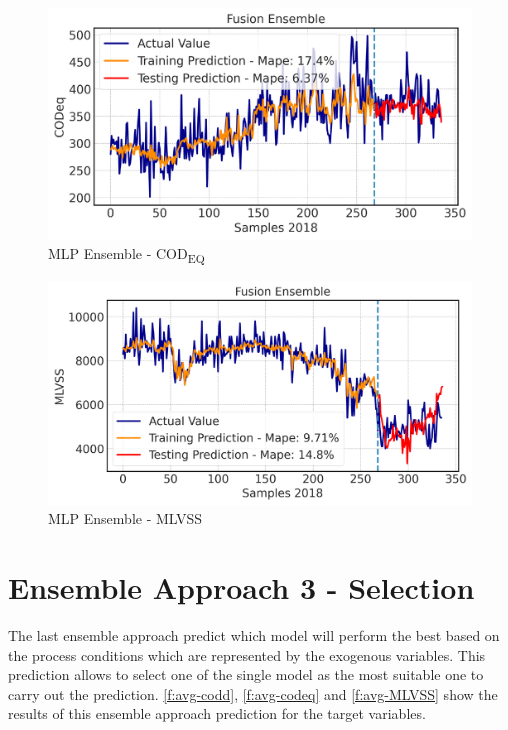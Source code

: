 \begin{figure}[h]
\centering
\includegraphics[width=\linewidth]{figures/Ch5/CODeq-ann.pdf}
\caption{MLP Ensemble - COD\textsubscript{EQ}}
\label{f:ann-codeq}
\end{figure}

\begin{figure}[h]
\centering
\includegraphics[width=\linewidth]{figures/Ch5/MVLSS-E_ann.pdf}
\caption{MLP Ensemble - MLVSS}
\label{f:ann-MLVSS}
\end{figure}

\section{Ensemble Approach 3 - Selection}
The last ensemble approach predict which model will perform the best based on the process conditions which are represented by the exogenous variables. This prediction allows to select one of the single model as the most suitable one to carry out the prediction. \autoref{f:avg-codd}, \autoref{f:avg-codeq} and \autoref{f:avg-MLVSS} show the results of this ensemble approach prediction for the target variables. 

